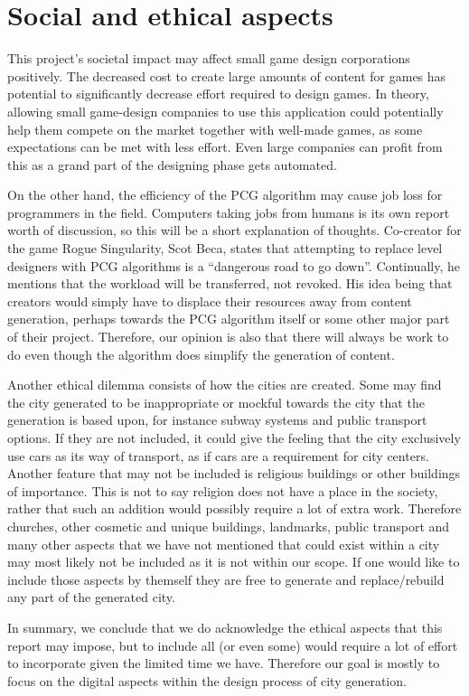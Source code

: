 \section{Social and ethical aspects}
This project's societal impact may affect small game design corporations positively.
The decreased cost to create large amounts of content for games has potential to significantly decrease effort required to design games.
In theory, allowing small game-design companies to use this application could potentially help them compete on the market together with well-made games, as some expectations can be met with less effort.
Even large companies can profit from this as a grand part of the designing phase gets automated.

On the other hand, the efficiency of the PCG algorithm may cause job loss for programmers in the field.
Computers taking jobs from humans is its own report worth of discussion, so this will be a short explanation of thoughts.
Co-creator for the game Rogue Singularity, Scot Beca, states that attempting to replace level designers with PCG algorithms is a ``dangerous road to go down''.
Continually, he mentions that the workload will be transferred, not revoked.
His idea being that creators would simply have to displace their resources away from content generation, perhaps towards the PCG algorithm itself or some other major part of their project.
Therefore, our opinion is also that there will always be work to do even though the algorithm does simplify the generation of content.

Another ethical dilemma consists of how the cities are created.
Some may find the city generated to be inappropriate or mockful towards the city that the generation is based upon, for instance subway systems and public transport options.
If they are not included, it could give the feeling that the city exclusively use cars as its way of transport, as if cars are a requirement for city centers.
Another feature that may not be included is religious buildings or other buildings of importance.
This is not to say religion does not have a place in the society, rather that such an addition would possibly require a lot of extra work.
Therefore churches, other cosmetic and unique buildings, landmarks, public transport and many other aspects that we have not mentioned that could exist within a city may most likely not be included as it is not within our scope.
If one would like to include those aspects by themself they are free to generate and replace/rebuild any part of the generated city.

In summary, we conclude that we do acknowledge the ethical aspects that this report may impose, but to include all (or even some) would require a lot of effort to incorporate given the limited time we have.
Therefore our goal is mostly to focus on the digital aspects within the design process of city generation.
